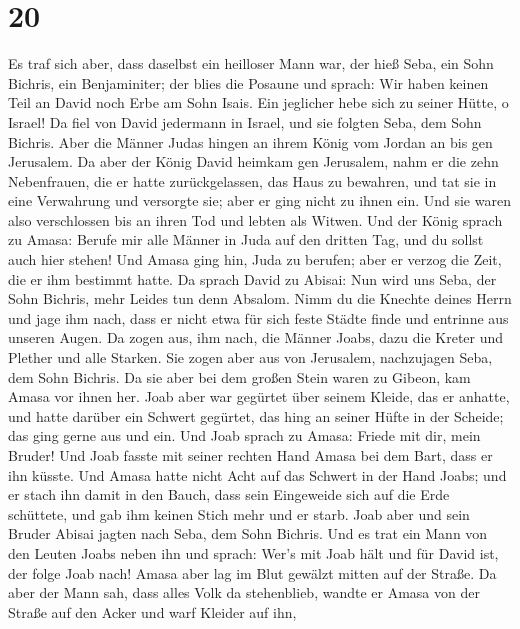 \hypertarget{section-19}{%
\section{20}\label{section-19}}

 Es traf sich aber, dass daselbst ein heilloser Mann war,
der hieß Seba, ein Sohn Bichris, ein Benjaminiter; der blies die Posaune
und sprach: Wir haben keinen Teil an David noch Erbe am Sohn Isais. Ein
jeglicher hebe sich zu seiner Hütte, o Israel!  Da fiel
von David jedermann in Israel, und sie folgten Seba, dem Sohn Bichris.
Aber die Männer Judas hingen an ihrem König vom Jordan an bis gen
Jerusalem.  Da aber der König David heimkam gen Jerusalem,
nahm er die zehn Nebenfrauen, die er hatte zurückgelassen, das Haus zu
bewahren, und tat sie in eine Verwahrung und versorgte sie; aber er ging
nicht zu ihnen ein. Und sie waren also verschlossen bis an ihren Tod und
lebten als Witwen.  Und der König sprach zu Amasa: Berufe
mir alle Männer in Juda auf den dritten Tag, und du sollst auch hier
stehen!  Und Amasa ging hin, Juda zu berufen; aber er
verzog die Zeit, die er ihm bestimmt hatte.  Da sprach
David zu Abisai: Nun wird uns Seba, der Sohn Bichris, mehr Leides tun
denn Absalom. Nimm du die Knechte deines Herrn und jage ihm nach, dass
er nicht etwa für sich feste Städte finde und entrinne aus unseren
Augen.  Da zogen aus, ihm nach, die Männer Joabs, dazu die
Kreter und Plether und alle Starken. Sie zogen aber aus von Jerusalem,
nachzujagen Seba, dem Sohn Bichris.  Da sie aber bei dem
großen Stein waren zu Gibeon, kam Amasa vor ihnen her. Joab aber war
gegürtet über seinem Kleide, das er anhatte, und hatte darüber ein
Schwert gegürtet, das hing an seiner Hüfte in der Scheide; das ging
gerne aus und ein.  Und Joab sprach zu Amasa: Friede mit
dir, mein Bruder! Und Joab fasste mit seiner rechten Hand Amasa bei dem
Bart, dass er ihn küsste.  Und Amasa hatte nicht Acht auf
das Schwert in der Hand Joabs; und er stach ihn damit in den Bauch, dass
sein Eingeweide sich auf die Erde schüttete, und gab ihm keinen Stich
mehr und er starb. Joab aber und sein Bruder Abisai jagten nach Seba,
dem Sohn Bichris.  Und es trat ein Mann von den Leuten
Joabs neben ihn und sprach: Wer's mit Joab hält und für David ist, der
folge Joab nach!  Amasa aber lag im Blut gewälzt mitten
auf der Straße. Da aber der Mann sah, dass alles Volk da stehenblieb,
wandte er Amasa von der Straße auf den Acker und warf Kleider auf ihn,
